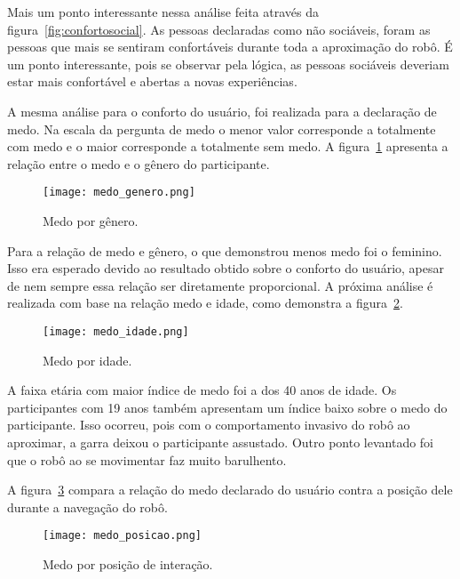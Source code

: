 Mais um ponto interessante nessa análise feita através da figura~\ref{fig:confortosocial}. As pessoas declaradas como não sociáveis, foram as pessoas que mais se sentiram confortáveis durante toda a aproximação do robô. É um ponto interessante, pois se observar pela lógica, as pessoas sociáveis deveriam estar mais confortável e abertas a novas experiências.

A mesma análise para o conforto do usuário, foi realizada para a declaração de medo. Na escala da pergunta de medo o menor valor corresponde a totalmente com medo e o maior corresponde a totalmente sem medo. A figura~\ref{fig:medogenero} apresenta a relação entre o medo e o gênero do participante.

\begin{figure}[ht!]
	\centering
	\begin{minipage}{0.65\textwidth}
		\caption{Medo por gênero.}
		\texttt{[image: medo\_genero.png]}
		\label{fig:medogenero}
	\end{minipage}
\end{figure}

Para a relação de medo e gênero, o que demonstrou menos medo foi o feminino. Isso era esperado devido ao resultado obtido sobre o conforto do usuário, apesar de nem sempre essa relação ser diretamente proporcional. A próxima análise é realizada com base na relação medo e idade, como demonstra a figura~\ref{fig:medoidade}.

\begin{figure}[ht!]
	\centering
	\begin{minipage}{0.65\textwidth}
		\caption{Medo por idade.}
		\texttt{[image: medo\_idade.png]}
		\label{fig:medoidade}
	\end{minipage}
\end{figure}

A faixa etária com maior índice de medo foi a dos 40 anos de idade. Os participantes com 19 anos também apresentam um índice baixo sobre o medo do participante. Isso ocorreu, pois com o comportamento invasivo do robô ao aproximar, a garra deixou o participante assustado. Outro ponto levantado foi que o robô ao se movimentar faz muito barulhento.

A figura~\ref{fig:medoposicao} compara a relação do medo declarado do usuário contra a posição dele durante a navegação do robô.

\begin{figure}[ht!]
	\centering
	\begin{minipage}{0.65\textwidth}
		\caption{Medo por posição de interação.}
		\texttt{[image: medo\_posicao.png]}
		\label{fig:medoposicao}
	\end{minipage}
\end{figure}

